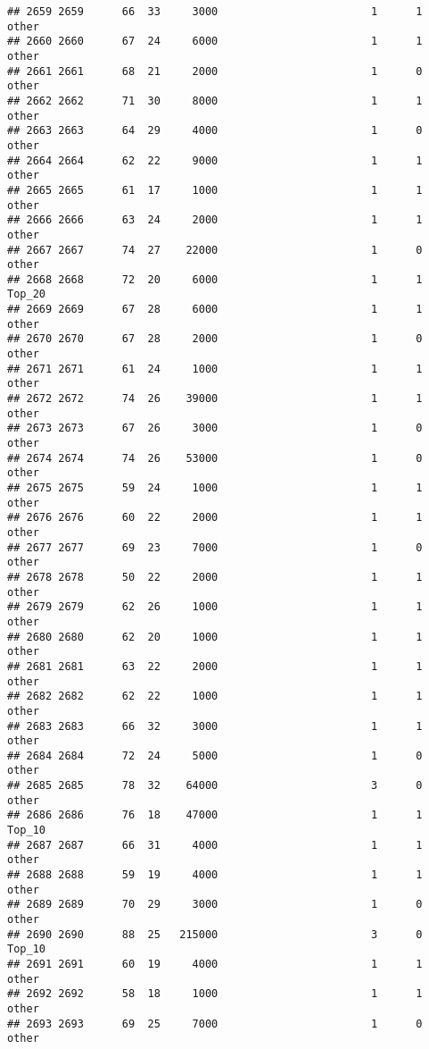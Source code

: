 \documentclass[
]{article}
\begin{document}
\begin{verbatim}
## 2659 2659      66  33     3000                        1      1    other
## 2660 2660      67  24     6000                        1      1    other
## 2661 2661      68  21     2000                        1      0    other
## 2662 2662      71  30     8000                        1      1    other
## 2663 2663      64  29     4000                        1      0    other
## 2664 2664      62  22     9000                        1      1    other
## 2665 2665      61  17     1000                        1      1    other
## 2666 2666      63  24     2000                        1      1    other
## 2667 2667      74  27    22000                        1      0    other
## 2668 2668      72  20     6000                        1      1   Top_20
## 2669 2669      67  28     6000                        1      1    other
## 2670 2670      67  28     2000                        1      0    other
## 2671 2671      61  24     1000                        1      1    other
## 2672 2672      74  26    39000                        1      1    other
## 2673 2673      67  26     3000                        1      0    other
## 2674 2674      74  26    53000                        1      0    other
## 2675 2675      59  24     1000                        1      1    other
## 2676 2676      60  22     2000                        1      1    other
## 2677 2677      69  23     7000                        1      0    other
## 2678 2678      50  22     2000                        1      1    other
## 2679 2679      62  26     1000                        1      1    other
## 2680 2680      62  20     1000                        1      1    other
## 2681 2681      63  22     2000                        1      1    other
## 2682 2682      62  22     1000                        1      1    other
## 2683 2683      66  32     3000                        1      1    other
## 2684 2684      72  24     5000                        1      0    other
## 2685 2685      78  32    64000                        3      0    other
## 2686 2686      76  18    47000                        1      1   Top_10
## 2687 2687      66  31     4000                        1      1    other
## 2688 2688      59  19     4000                        1      1    other
## 2689 2689      70  29     3000                        1      0    other
## 2690 2690      88  25   215000                        3      0   Top_10
## 2691 2691      60  19     4000                        1      1    other
## 2692 2692      58  18     1000                        1      1    other
## 2693 2693      69  25     7000                        1      0    other

\end{verbatim}
\end{document}
